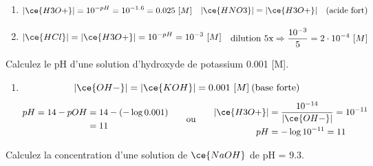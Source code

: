 \documentclass[
  11pt,
  a4paper,
  openany]{book}
\providecommand{\tightlist}{%
  \setlength{\itemsep}{0pt}\setlength{\parskip}{0pt}}
\begin{document}
\begin{Answer}

\begin{enumerate}
\def\labelenumi{\alph{enumi}.}
\tightlist
\item
  \[
  \begin{split}
  |\ce{H3O+}| = 10^{-pH} = 10^{-1.6} = 0.025\ [M]
  \end{split}
  \quad
  \begin{split}
  |\ce{HNO3}| = |\ce{H3O+}| \quad \text{(acide fort)}
  \end{split}
  \]
\item
  \[
  \begin{split}
  |\ce{HCl}| = |\ce{H3O+}| = 10^{-pH} = 10^{-3}\ [M]
  \end{split}
  \quad
  \begin{split}
  \text{dilution 5x} \Rightarrow \frac{10^{-3}}{5} = 2 \cdot 10^{-4}\ [M]
  \end{split}
  \]
\end{enumerate}

\end{Answer}

\begin{Exercise}
Calculez le pH d'une solution d'hydroxyde de potassium 0.001 {[}M{]}.

\end{Exercise}

\begin{Answer}

\begin{enumerate}
\def\labelenumi{\alph{enumi}.}
\tightlist
\item
  \[ |\ce{OH-}| = |\ce{KOH}| = 0.001\ [M] \: \text{(base forte)} \]
  \[
  \begin{split}
  pH = 14 - pOH &= 14 - ( - \log 0.001 ) \\
    &= 11
  \end{split}
  \qquad \text{ou} \qquad
  \begin{split}
  |\ce{H3O+}| &= \frac{10^{-14}}{|\ce{OH-}|} = 10^{-11} \\
  pH &= - \log 10^{-11} = 11
  \end{split}
  \]
\end{enumerate}

\end{Answer}

\begin{Exercise}
Calculez la concentration d'une solution de \(\ce{NaOH}\) de pH = 9.3.

\end{Exercise}
\end{document}
